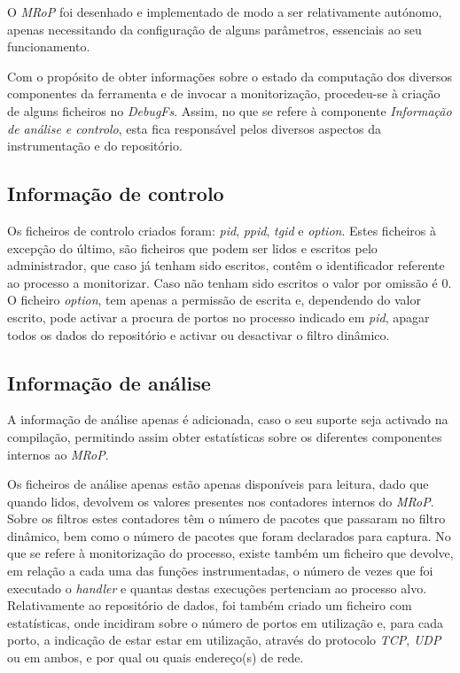 O \textit{MRoP} foi desenhado e implementado de modo a ser relativamente autónomo, apenas necessitando da configuração de alguns parâmetros, essenciais ao seu funcionamento.

Com o propósito de obter informações sobre o estado da computação dos diversos componentes da ferramenta e de invocar a monitorização, procedeu-se à criação de alguns ficheiros no \textit{DebugFs}.
Assim, no que se refere à componente \textit{Informação de análise e controlo}, esta fica responsável pelos diversos aspectos da instrumentação e do repositório.

\subsection{Informação de controlo}

Os ficheiros de controlo criados foram: \textit{pid}, \textit{ppid}, \textit{tgid} e \textit{option}.
Estes ficheiros à excepção do último, são ficheiros que podem ser lidos e escritos pelo administrador, que caso já tenham sido escritos, contêm o identificador referente ao processo a monitorizar.
Caso não tenham sido escritos o valor por omissão é 0.
O ficheiro \textit{option}, tem apenas a permissão de escrita e, dependendo do valor escrito, pode activar a procura de portos no processo indicado em \textit{pid}, apagar todos os dados do repositório e activar ou desactivar o filtro dinâmico.

\subsection{Informação de análise}
A informação de análise apenas é adicionada, caso o seu suporte seja activado na compilação, permitindo assim obter estatísticas sobre os diferentes componentes internos ao \textit{MRoP}.

Os ficheiros de análise apenas estão apenas disponíveis para leitura, dado que quando lidos, devolvem os valores presentes nos contadores internos do \textit{MRoP}.
Sobre os filtros estes contadores têm o número de pacotes que passaram no filtro dinâmico, bem como o número de pacotes que foram declarados para captura.
No que se refere à monitorização do processo, existe também um ficheiro que devolve, em relação a cada uma das funções instrumentadas, o número de vezes que foi executado o \textit{handler} e quantas destas execuções pertenciam ao processo alvo.
Relativamente ao repositório de dados, foi também criado um ficheiro com estatísticas, onde incidiram sobre o número de portos em utilização e, para cada porto, a indicação de estar estar em utilização, através do protocolo \textit{TCP}, \textit{UDP} ou em ambos, e por qual ou quais endereço(s) de rede.


